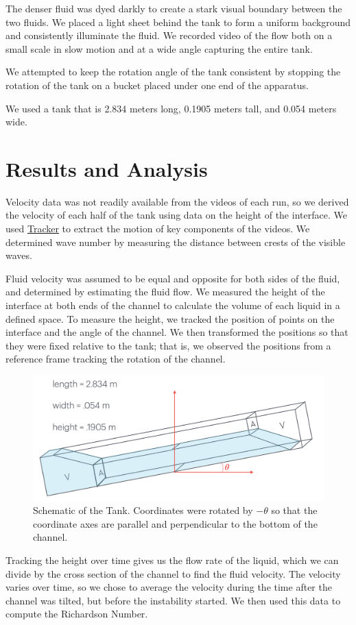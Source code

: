 \documentclass{article}
\begin{document}
The denser fluid was dyed darkly to create a stark visual boundary between the
two fluids. We placed a light sheet behind the tank to form a uniform background
and consistently illuminate the fluid. We recorded video of the flow both on a
small scale in slow motion and at a wide angle capturing the entire tank.

We attempted to keep the rotation angle of the tank consistent by stopping the
rotation of the tank on a bucket placed under one end of the apparatus.

We used a tank that is 2.834 meters long, 0.1905 meters tall, and 0.054 meters
wide.

\section{Results and Analysis}

Velocity data was not readily available from the videos of each run, so we
derived the velocity of each half of the tank using data on the height of the
interface. We used \href{https://physlets.org/tracker/}{Tracker} to extract the
motion of key components of the videos. We determined wave number by measuring
the distance between crests of the visible waves.

Fluid velocity was assumed to be equal and opposite for both sides of the fluid,
and determined by estimating the fluid flow. We measured the height of the
interface at both ends of the channel to calculate the volume of each liquid in
a defined space. To measure the height, we tracked the position of points on the
interface and the angle of the channel. We then transformed the positions so
that they were fixed relative to the tank; that is, we observed the positions
from a reference frame tracking the rotation of the channel.
\begin{figure}[h]
    \centering
    \includegraphics[width=5in]{tank-schematic.png}
    \caption{Schematic of the Tank. Coordinates were rotated by $-\theta$ so that the coordinate axes are parallel and perpendicular to the bottom of the channel.}
    \label{img:tank-schematic}
\end{figure}
Tracking the height over time gives us the flow rate of the liquid, which we can
divide by the cross section of the channel to find the fluid velocity. The
velocity varies over time, so we chose to average the velocity during the time
after the channel was tilted, but before the instability started. We then used
this data to compute the Richardson Number.
\end{document}
